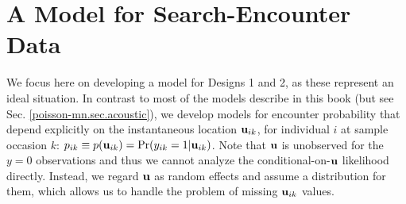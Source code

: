 \section{A Model for Search-Encounter Data}

We focus here on developing a model for Designs 1 and 2, as these
represent an ideal situation.  In contrast to most of the models
describe in this book (but see Sec. \ref{poisson-mn.sec.acoustic}), we
develop models for encounter probability that depend explicitly on the
instantaneous location ${\bf u}_{ik}$, for individual $i$ at sample
occasion $k$: $p_{ik} \equiv p({\bf u}_{ik}) = \Pr(y_{ik}=1|{\bf
  u}_{ik})$.  Note that ${\bf u}$ is unobserved for the $y=0$
observations and thus we cannot analyze the conditional-on-${\bf u}$
likelihood directly. Instead, we regard ${\bf u}$ as random effects
and assume a distribution for them, which allows us to handle the
problem of missing ${\bf u}_{ik}$ values.

